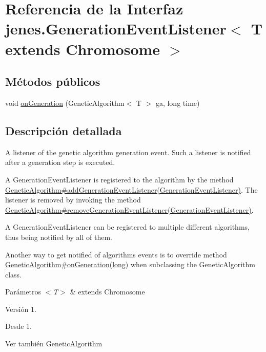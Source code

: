 \hypertarget{interfacejenes_1_1_generation_event_listener_3_01_t_01extends_01_chromosome_01_4}{\section{Referencia de la Interfaz jenes.\-Generation\-Event\-Listener$<$ T extends Chromosome $>$}
\label{interfacejenes_1_1_generation_event_listener_3_01_t_01extends_01_chromosome_01_4}
}
\subsection*{Métodos públicos}
\begin{DoxyCompactItemize}
\item 
void \hyperlink{interfacejenes_1_1_generation_event_listener_3_01_t_01extends_01_chromosome_01_4_aae224991bea21e4eca0f81ce0fb464e9}{on\-Generation} (Genetic\-Algorithm$<$ T $>$ ga, long time)
\end{DoxyCompactItemize}


\subsection{Descripción detallada}
A listener of the genetic algorithm generation event. Such a listener is notified after a generation step is executed. 

A {\ttfamily Generation\-Event\-Listener} is registered to the algorithm by the method \hyperlink{}{Genetic\-Algorithm\#add\-Generation\-Event\-Listener(\-Generation\-Event\-Listener)}. The listener is removed by invoking the method \hyperlink{}{Genetic\-Algorithm\#remove\-Generation\-Event\-Listener(\-Generation\-Event\-Listener)}. 

A {\ttfamily Generation\-Event\-Listener} can be registered to multiple different algorithms, thus being notified by all of them. 

Another way to get notified of algorithms events is to override method \hyperlink{}{Genetic\-Algorithm\#on\-Generation(long)} when subclassing the {\ttfamily Genetic\-Algorithm} class. 


\begin{DoxyParams}{Parámetros}
{\em $<$\-T$>$} & extends Chromosome\\
\hline
\end{DoxyParams}
\begin{DoxyVersion}{Versión}
1. 
\end{DoxyVersion}
\begin{DoxySince}{Desde}
1.
\end{DoxySince}
\begin{DoxySeeAlso}{Ver también}
Genetic\-Algorithm 
\end{DoxySeeAlso}


